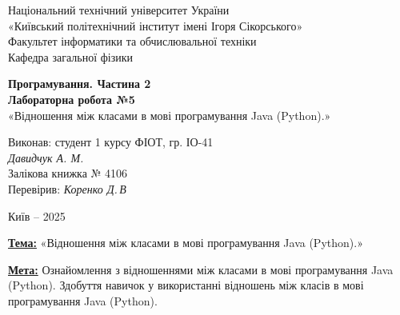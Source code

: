 \documentclass[12pt,a4paper]{article}
\begin{document}
    \begin{titlepage}

        \thispagestyle{empty}
        \begin{center}
        \large
        Національний технічний університет України\\
        «Київський політехнічний інститут імені Ігоря Сікорського»\\[1em]
        Факультет інформатики та обчислювальної техніки\\
        Кафедра загальної фізики
        \end{center}

        \vfill

        \begin{center}
        \textbf{\LARGE Програмування. Частина 2}\\[2em]
        \textbf{\Large Лабораторна робота №5}\\
        «Відношення між класами в мові програмування Java (Python).» 
        \end{center}

        \vfill

        \begin{flushright}
        Виконав: студент 1 курсу ФІОТ, гр. ІО-41\\
        \textit{Давидчук А. М.}\\
        Залікова книжка № 4106\\[1em]
        Перевірив: \textit{Коренко Д.\,В}
        \end{flushright}

        \vfill

        \begin{center}
        Київ -- 2025
        \end{center}

    \end{titlepage}

    \setlength{\parindent}{0pt}


    \textbf{\underline{Тема:}} «Відношення між класами в мові програмування Java (Python).»

    \vspace{1em}

    \textbf{\underline{Мета:}} Ознайомлення з відношеннями між класами в мові програмування Java (Python). Здобуття навичок у використанні відношень між класів в мові програмування Java (Python).

    \vspace{1em}
\end{document}

